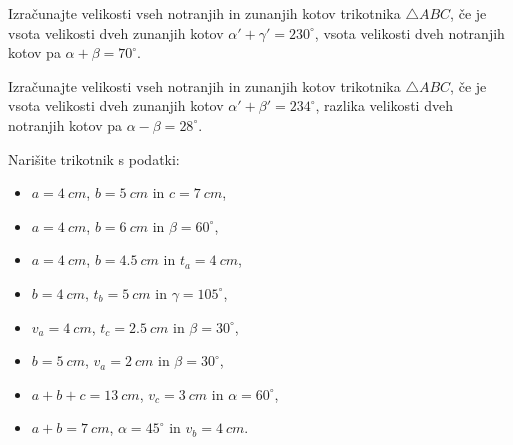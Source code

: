 \begin{naloga}
\begin{figure}[H]

                \end{figure}
            \end{naloga}
                
        
            \begin{naloga}
                Izračunajte velikosti vseh notranjih in zunanjih kotov trikotnika $\triangle ABC$, 
                če je vsota velikosti dveh zunanjih kotov $\alpha'+\gamma'=230^\circ$, vsota velikosti dveh notranjih kotov pa $\alpha+\beta=70^\circ$.
            \end{naloga}

            \begin{naloga}
                Izračunajte velikosti vseh notranjih in zunanjih kotov trikotnika $\triangle ABC$, 
                če je vsota velikosti dveh zunanjih kotov $\alpha'+\beta'=234^\circ$, razlika velikosti dveh notranjih kotov pa $\alpha-\beta=28^\circ$.
            \end{naloga}

    
            \begin{naloga}
                Narišite trikotnik s podatki:
                \begin{itemize}
                    \item $a=4~cm$, $b=5~cm$ in $c=7~cm$,
                    \item $a=4~cm$, $b=6~cm$ in $\beta=60^\circ$,
                    \item $a=4~cm$, $b=4.5~cm$ in $t_a=4~cm$,
                    \item $b=4~cm$, $t_b=5~cm$ in $\gamma=105^\circ$,
                    \item $v_a=4~cm$, $t_c=2.5~cm$ in $\beta=30^\circ$,
                    \item $b=5~cm$, $v_a=2~cm$ in $\beta=30^\circ$,
                    \item $a+b+c=13~cm$, $v_c=3~cm$ in $\alpha=60^\circ$,
                    \item $a+b=7~cm$, $\alpha=45^\circ$ in $v_b=4~cm$.
                \end{itemize}
            \end{naloga}
        
